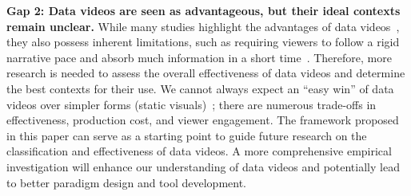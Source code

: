\textbf{Gap 2: Data videos are seen as advantageous, but their ideal contexts remain unclear.}
While many studies highlight the advantages of data videos~\cite{Amini2018a, Robertson2008, Rodrigues2024}, they also possess inherent limitations, such as requiring viewers to follow a rigid narrative pace and absorb much information in a short time~\cite{Riche2018}. 
Therefore, more research is needed to assess the overall effectiveness of data videos and determine the best contexts for their use.
We cannot always expect an ``easy win'' of data videos over simpler forms (\eg static visuals)~\cite{Amini2018a, Kong2019}; there are numerous trade-offs in effectiveness, production cost, and viewer engagement. 
The framework proposed in this paper can serve as a starting point to guide future research on the classification and effectiveness of data videos.
A more comprehensive empirical investigation will enhance our understanding of data videos and potentially lead to better paradigm design and tool development.

